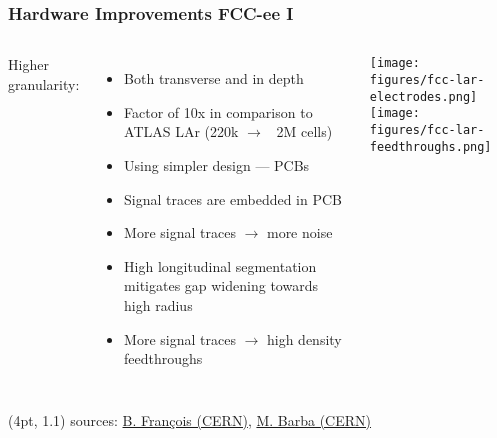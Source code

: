 \documentclass[aspectratio=169]{beamer}
\newcommand{\bluetext}[1]{%
  \textcolor{myBlue}{#1}
}
\begin{document}
\begin{frame}
  \frametitle{Hardware Improvements FCC-ee I}

  \begin{columns}[c]

    \bluetext{Higher granularity:}
    \begin{itemize}
      \item Both transverse and in depth
      \item Factor of 10x in comparison to ATLAS LAr (220k $\rightarrow$ ~2M
            cells)
      \item Using simpler design --- PCBs
      \item Signal traces are embedded in PCB
      \item More signal traces $\rightarrow$ more noise
      \item High longitudinal segmentation mitigates gap widening towards high
            radius
      \item More signal traces $\rightarrow$ high density feedthroughs
    \end{itemize}


    \begin{center}
      \texttt{[image: figures/fcc-lar-electrodes.png]}\\[1em]
      \texttt{[image: figures/fcc-lar-feedthroughs.png]}
    \end{center}
  \end{columns}

  \begin{textblock*}{\paperwidth}(4pt, 1.1\textheight)
    \tiny sources:
    \href{https://indico.cern.ch/event/969249/contributions/4086276/attachments/2132741/3591642/20201029_LAr_workingMeeting_Brieuc.pdf}
         {B. François (CERN)},
    \href{https://indico.cern.ch/event/1021554/contributions/4291715/attachments/2219159/3757597/Presentation_meeting_1_April_2021.pdf}
         {M. Barba (CERN)}
  \end{textblock*}
\end{frame}
\end{document}
